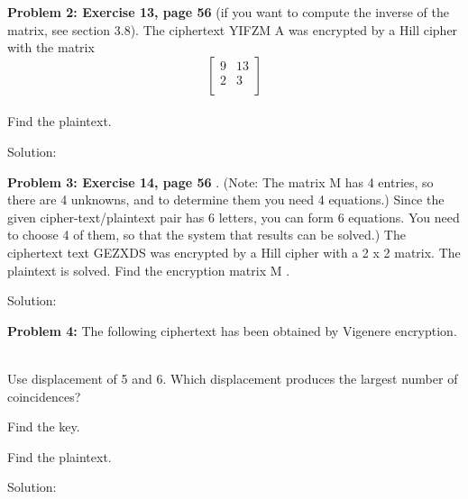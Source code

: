 \documentclass[12pt,letterpaper,final]{report}
\begin{document}
\bigskip
\noindent\textbf{Problem 2: Exercise 13, page 56} (if you want to compute the inverse of the matrix, see section 3.8). The ciphertext YIFZM A was encrypted by a Hill cipher with the matrix \[\begin{bmatrix} 9 &13 \\ 2 & 3   \\ \end{bmatrix} \] \\ Find the plaintext. 

\bigskip Solution: 


\bigskip
\noindent\textbf{Problem 3: Exercise 14, page 56} . (Note: The matrix M has 4 entries, so there are 4 unknowns, and to determine them you need 4 equations.) 
Since the given cipher-text/plaintext pair has 6 letters, you can form 6 equations. You need to choose 4 of them, so that the system that results can be solved.) The ciphertext text GEZXDS was encrypted by a Hill cipher with a 2 x 2 matrix. The plaintext is solved. Find the encryption matrix M .

\bigskip Solution: 


\bigskip
\noindent\textbf{Problem 4:} The following ciphertext has been obtained by Vigenere encryption.\\\\

\bigskip
{}
\begin{alphalist}
	\item Use displacement of 5 and 6. Which displacement produces the largest number of coincidences?
	\item Find the key.
	\item Find the plaintext.
\end{alphalist}

\bigskip
\indent Solution: 
\end{document}

